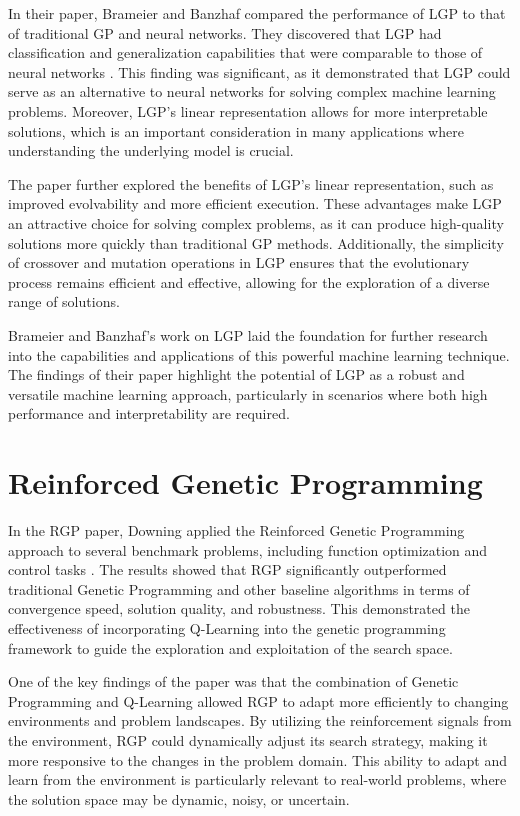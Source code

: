 \documentclass[12pt, final]{dalcsthesis}
\begin{document}
In their paper, Brameier and Banzhaf compared the performance of LGP to that of traditional GP and neural networks. They discovered that LGP had classification and generalization capabilities that were comparable to those of neural networks \cite{brameier2001comparison}. This finding was significant, as it demonstrated that LGP could serve as an alternative to neural networks for solving complex machine learning problems. Moreover, LGP's linear representation allows for more interpretable solutions, which is an important consideration in many applications where understanding the underlying model is crucial.

The paper further explored the benefits of LGP's linear representation, such as improved evolvability and more efficient execution. These advantages make LGP an attractive choice for solving complex problems, as it can produce high-quality solutions more quickly than traditional GP methods. Additionally, the simplicity of crossover and mutation operations in LGP ensures that the evolutionary process remains efficient and effective, allowing for the exploration of a diverse range of solutions.

Brameier and Banzhaf's work on LGP laid the foundation for further research into the capabilities and applications of this powerful machine learning technique. The findings of their paper highlight the potential of LGP as a robust and versatile machine learning approach, particularly in scenarios where both high performance and interpretability are required.

\section{Reinforced Genetic Programming}
In the RGP paper, Downing applied the Reinforced Genetic Programming approach to several benchmark problems, including function optimization and control tasks \cite{downing1995reinforced}. The results showed that RGP significantly outperformed traditional Genetic Programming and other baseline algorithms in terms of convergence speed, solution quality, and robustness. This demonstrated the effectiveness of incorporating Q-Learning into the genetic programming framework to guide the exploration and exploitation of the search space.

One of the key findings of the paper was that the combination of Genetic Programming and Q-Learning allowed RGP to adapt more efficiently to changing environments and problem landscapes. By utilizing the reinforcement signals from the environment, RGP could dynamically adjust its search strategy, making it more responsive to the changes in the problem domain. This ability to adapt and learn from the environment is particularly relevant to real-world problems, where the solution space may be dynamic, noisy, or uncertain.
\end{document}

